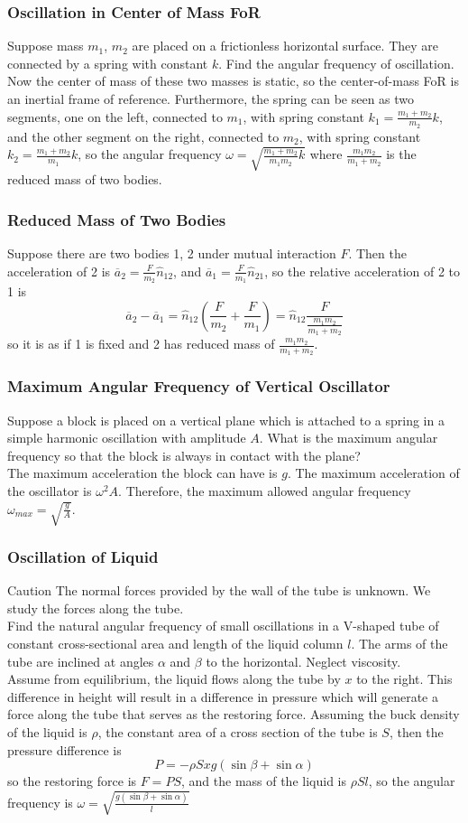 \documentclass{beamer}
\begin{document}
\begin{frame}
\frametitle{Oscillation in Center of Mass FoR}
Suppose mass $m_1$, $m_2$ are placed on a frictionless horizontal surface. They are connected by a spring with constant $k$. Find the angular frequency of oscillation.\\
Now the center of mass of these two masses is static, so the center-of-mass FoR is an inertial frame of reference. Furthermore, the spring can be seen as two segments, one on the left, connected to $m_1$, with spring constant $k_1=\frac{m_1+m_2}{m_2}k$, and the other segment on the right, connected to $m_2$, with spring constant $k_2=\frac{m_1+m_2}{m_1}k$, so the angular frequency $\omega=\sqrt{\frac{m_1+m_2}{m_1m_2}k}$
where $\frac{m_1m_2}{m_1+m_2}$ is the \alert{reduced mass} of two bodies.
\end{frame}
\begin{frame}
\frametitle{Reduced Mass of Two Bodies}
Suppose there are two bodies 1, 2 under mutual interaction $F$. Then the acceleration of 2 is $\overline a_2=\frac{F}{m_2}\hat n_{12}$, and $\overline a_1=\frac{F}{m_1}\hat n_{21}$, so the relative acceleration of 2 to 1 is
\[\overline a_2-\overline a_1=\hat n_{12}\left(\frac{F}{m_2}+\frac{F}{m_1}\right)=\hat n_{12}\frac{F}{\frac{m_1m_2}{m_1+m_2}}\]
so it is as if 1 is fixed and 2 has \alert{reduced mass} of $\frac{m_1m_2}{m_1+m_2}$.
\end{frame}
\begin{frame}
\frametitle{Maximum Angular Frequency of Vertical Oscillator}
Suppose a block is placed on a vertical plane which is attached to a spring in a simple harmonic oscillation with amplitude $A$. What is the maximum angular frequency so that the block is always in contact with the plane?\\
The maximum acceleration the block can have is $g$. The maximum acceleration of the oscillator is $\omega^2 A$. Therefore, the maximum allowed angular frequency $\omega_{max}=\sqrt{\frac{g}{A}}$.
\end{frame}
\begin{frame}
\frametitle{Oscillation of Liquid}
\alert{Caution} The normal forces provided by the wall of the tube is unknown. We study the forces \alert{along} the tube.\\
Find the natural angular frequency of small oscillations in a V-shaped tube of constant cross-sectional area and length of the liquid column $l$. The arms of the tube are inclined at angles $\alpha$ and $\beta$ to the horizontal. Neglect viscosity.\\
Assume from equilibrium, the liquid flows along the tube by $x$ to the right. This difference in height will result in a difference in pressure which will generate a force along the tube that serves as the restoring force. Assuming the buck density of the liquid is $\rho$, the constant area of a cross section of the tube is $S$, then the pressure difference is
\[P=-\rho Sxg(\sin\beta+\sin\alpha)\]
so the restoring force is $F=PS$, and the mass of the liquid is $\rho Sl$, so the angular frequency is $\omega=\sqrt{\frac{g(\sin\beta+\sin\alpha)}{l}}$
\end{frame}
\end{document}
